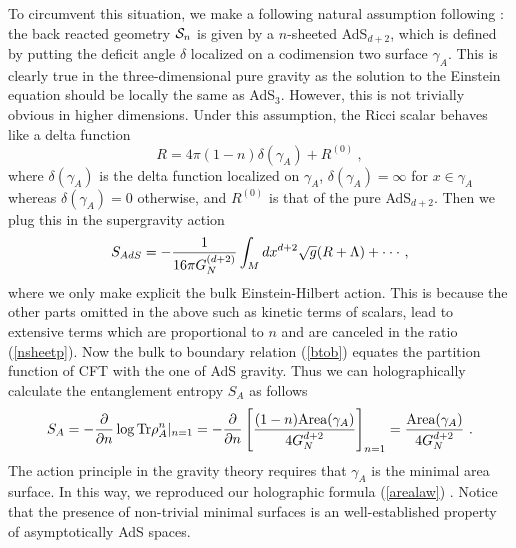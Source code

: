 \documentclass[12pt]{article}
\def\frac#1#2{{#1\over #2}}
\def\frac#1#2{{#1\over #2}}
\begin{document}
To circumvent this situation, we make a following natural assumption following \cite{Fursaev:2006ih}:
the back reacted geometry ${\cal S}_n$ is given by a $n$-sheeted AdS$_{d+2}$, which is defined by
putting the deficit angle $\delta$ localized on a codimension two surface $\gamma_A$.
This is clearly true in the three-dimensional pure gravity as the solution to the Einstein equation should
be locally the same as AdS$_3$. However, this is not trivially obvious in higher dimensions.
Under this assumption,
the Ricci scalar behaves like a delta
function
\begin{equation}
R=4\pi (1-n)\delta(\gamma_A)+R^{(0)} \ ,
\end{equation}
where
$\delta(\gamma_A)$ is the delta function localized on $\gamma_A$,
$\delta(\gamma_A)=\infty$ for $x\in \gamma_A$
whereas $\delta(\gamma_A)=0$ otherwise,
and $R^{(0)}$ is that of the pure AdS$_{d+2}$. Then we plug this in the supergravity action
\begin{equation}
S_{AdS}=-\frac{1}{16\pi G_N^{(d+2)}}\int_M
dx^{d+2}\sqrt{g}(R+\Lambda)+\cdot\cdot\cdot \ ,
\end{equation}
where we only make explicit the bulk Einstein-Hilbert action. This is because the
other parts omitted in the above such as kinetic terms of scalars, lead to extensive
terms which are proportional to $n$ and are canceled in the ratio (\ref{nsheetp}).
Now the bulk to boundary relation (\ref{btob}) equates the partition function of CFT with the one of
AdS gravity. Thus we can holographically calculate the entanglement
entropy $S_A$ as follows
\begin{equation}\label{HolEE}
S_A=-\frac{\partial }{\partial n}\log
\mbox{Tr}\rho_A^n|_{n=1}=-\frac{\partial }{\partial
n}\left[\frac{(1-n)\mbox{Area}(\gamma_A)}{4G_N^{d+2}}\right]_{n=1}
=\frac{\mbox{Area}(\gamma_A)}{4G_N^{d+2}} \ .
\end{equation}
The action principle in the gravity theory requires that $\gamma_A$ is
the minimal area surface. In this way, we reproduced
our holographic formula (\ref{arealaw}) \cite{Fursaev:2006ih}. Notice that the presence of
non-trivial minimal surfaces is an well-established property of asymptotically
AdS spaces.
\end{document}
